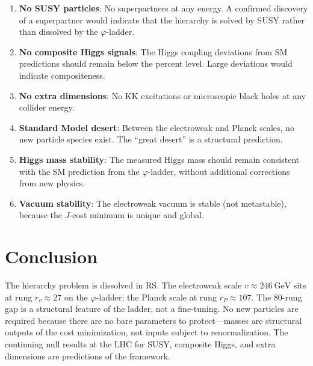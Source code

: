 \documentclass[12pt,a4paper]{article}
\theoremstyle{definition}
\theoremstyle{remark}
\begin{document}
\begin{enumerate}
  \item \textbf{No SUSY particles}: No superpartners at any
  energy.  A confirmed discovery of a superpartner would
  indicate that the hierarchy is solved by SUSY rather than
  dissolved by the $\varphi$-ladder.

  \item \textbf{No composite Higgs signals}: The Higgs
  coupling deviations from SM predictions should remain
  below the percent level.  Large deviations would indicate
  compositeness.

  \item \textbf{No extra dimensions}: No KK excitations or
  microscopic black holes at any collider energy.

  \item \textbf{Standard Model desert}: Between the
  electroweak and Planck scales, no new particle species
  exist.  The ``great desert'' is a structural prediction.

  \item \textbf{Higgs mass stability}: The measured Higgs
  mass should remain consistent with the SM prediction
  from the $\varphi$-ladder, without additional corrections
  from new physics.

  \item \textbf{Vacuum stability}: The electroweak vacuum
  is stable (not metastable), because the $J$-cost minimum
  is unique and global.
\end{enumerate}

\section{Conclusion}
\label{sec:conclusion}

The hierarchy problem is dissolved in RS.  The electroweak
scale $v \approx 246~\mathrm{GeV}$ sits at rung
$r_v \approx 27$ on the $\varphi$-ladder; the Planck scale
at rung $r_P \approx 107$.  The 80-rung gap is a structural
feature of the ladder, not a fine-tuning.  No new particles
are required because there are no bare parameters to
protect---masses are structural outputs of the cost
minimization, not inputs subject to renormalization.  The
continuing null results at the LHC for SUSY, composite
Higgs, and extra dimensions are predictions of the
framework.
\end{document}
